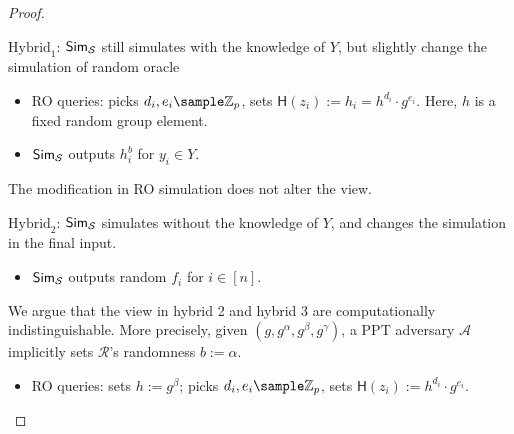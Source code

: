 \begin{proof}
\begin{trivlist}
\begin{center}
\end{center}

\item $\text{Hybrid}_1$: $\mathsf{Sim}_\mathcal{S}$ still simulates with the knowledge of $Y$, 
    but slightly change the simulation of random oracle 
\begin{itemize}
    \item RO queries: picks $d_i, e_i \sample \mathbb{Z}_p$, sets $\mathsf{H}(z_i):= h_i = h^{d_i} \cdot g^{e_i}$. 
        Here, $h$ is a fixed random group element.  

    \item $\mathsf{Sim}_\mathcal{S}$ outputs $h_i^b$ for $y_i \in Y$.            
\end{itemize}
The modification in RO simulation does not alter the view. 

\begin{center}
\end{center}

\item $\text{Hybrid}_2$: $\mathsf{Sim}_\mathcal{S}$ simulates without the knowledge of $Y$, 
    and changes the simulation in the final input.  
\begin{itemize}
    \item $\mathsf{Sim}_\mathcal{S}$ outputs random $f_i$ for $i \in [n]$.       
\end{itemize}
We argue that the view in hybrid 2 and hybrid 3 are computationally indistinguishable. 
More precisely, given $(g, g^\alpha, g^\beta, g^\gamma)$, 
a PPT adversary $\mathcal{A}$  implicitly sets $\mathcal{R}$'s randomness $b:=\alpha$. 
\begin{itemize}
    \item RO queries: sets $h := g^\beta$; picks $d_i, e_i \sample \mathbb{Z}_p$, sets $\mathsf{H}(z_i):=h^{d_i} \cdot g^{e_i}$. 


\end{itemize}
\end{trivlist}
\end{proof}
